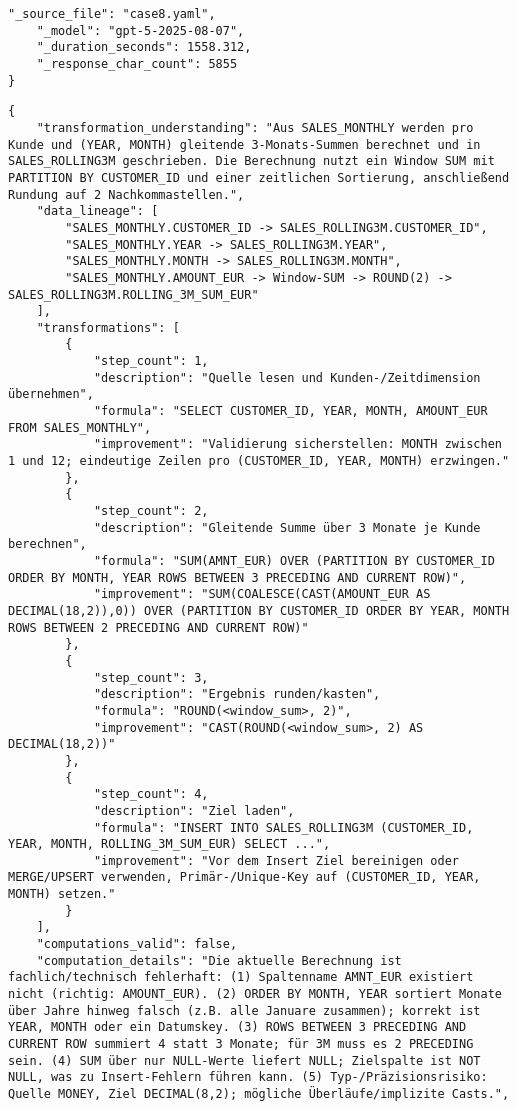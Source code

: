 \begin{lstlisting}[caption={Ausgabe: GPT-5 Anwendungsfall 8 Konsistenzdurchlauf},label={gpt_case8_prompt2}]
    "_source_file": "case8.yaml",
    "_model": "gpt-5-2025-08-07",
    "_duration_seconds": 1558.312,
    "_response_char_count": 5855
}
\end{lstlisting}

\begin{lstlisting}[caption={Ausgabe: GPT-5 Anwendungsfall 8 Robustheitsdurchlauf},label={gpt_case8_prompt3}]
{
    "transformation_understanding": "Aus SALES_MONTHLY werden pro Kunde und (YEAR, MONTH) gleitende 3-Monats-Summen berechnet und in SALES_ROLLING3M geschrieben. Die Berechnung nutzt ein Window SUM mit PARTITION BY CUSTOMER_ID und einer zeitlichen Sortierung, anschließend Rundung auf 2 Nachkommastellen.",
    "data_lineage": [
        "SALES_MONTHLY.CUSTOMER_ID -> SALES_ROLLING3M.CUSTOMER_ID",
        "SALES_MONTHLY.YEAR -> SALES_ROLLING3M.YEAR",
        "SALES_MONTHLY.MONTH -> SALES_ROLLING3M.MONTH",
        "SALES_MONTHLY.AMOUNT_EUR -> Window-SUM -> ROUND(2) -> SALES_ROLLING3M.ROLLING_3M_SUM_EUR"
    ],
    "transformations": [
        {
            "step_count": 1,
            "description": "Quelle lesen und Kunden-/Zeitdimension übernehmen",
            "formula": "SELECT CUSTOMER_ID, YEAR, MONTH, AMOUNT_EUR FROM SALES_MONTHLY",
            "improvement": "Validierung sicherstellen: MONTH zwischen 1 und 12; eindeutige Zeilen pro (CUSTOMER_ID, YEAR, MONTH) erzwingen."
        },
        {
            "step_count": 2,
            "description": "Gleitende Summe über 3 Monate je Kunde berechnen",
            "formula": "SUM(AMNT_EUR) OVER (PARTITION BY CUSTOMER_ID ORDER BY MONTH, YEAR ROWS BETWEEN 3 PRECEDING AND CURRENT ROW)",
            "improvement": "SUM(COALESCE(CAST(AMOUNT_EUR AS DECIMAL(18,2)),0)) OVER (PARTITION BY CUSTOMER_ID ORDER BY YEAR, MONTH ROWS BETWEEN 2 PRECEDING AND CURRENT ROW)"
        },
        {
            "step_count": 3,
            "description": "Ergebnis runden/kasten",
            "formula": "ROUND(<window_sum>, 2)",
            "improvement": "CAST(ROUND(<window_sum>, 2) AS DECIMAL(18,2))"
        },
        {
            "step_count": 4,
            "description": "Ziel laden",
            "formula": "INSERT INTO SALES_ROLLING3M (CUSTOMER_ID, YEAR, MONTH, ROLLING_3M_SUM_EUR) SELECT ...",
            "improvement": "Vor dem Insert Ziel bereinigen oder MERGE/UPSERT verwenden, Primär-/Unique-Key auf (CUSTOMER_ID, YEAR, MONTH) setzen."
        }
    ],
    "computations_valid": false,
    "computation_details": "Die aktuelle Berechnung ist fachlich/technisch fehlerhaft: (1) Spaltenname AMNT_EUR existiert nicht (richtig: AMOUNT_EUR). (2) ORDER BY MONTH, YEAR sortiert Monate über Jahre hinweg falsch (z.B. alle Januare zusammen); korrekt ist YEAR, MONTH oder ein Datumskey. (3) ROWS BETWEEN 3 PRECEDING AND CURRENT ROW summiert 4 statt 3 Monate; für 3M muss es 2 PRECEDING sein. (4) SUM über nur NULL-Werte liefert NULL; Zielspalte ist NOT NULL, was zu Insert-Fehlern führen kann. (5) Typ-/Präzisionsrisiko: Quelle MONEY, Ziel DECIMAL(8,2); mögliche Überläufe/implizite Casts.",

\end{lstlisting}
